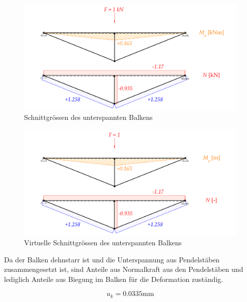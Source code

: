 \documentclass[
  letterpaper,
  DIV=11]{scrreprt}
\begin{document}
\begin{figure}[H]

{\centering \includegraphics{index_files/mediabag/bilder/aufgabe_ems_fourier_schnittgroessen.pdf}

}

\caption{\label{fig-ems-fourier_schnittgroessen_real}Schnittgrössen des
unterspannten Balkens}

\end{figure}

\begin{figure}[H]

{\centering \includegraphics{index_files/mediabag/bilder/aufgabe_ems_fourier_schnittgroessen_fikt.pdf}

}

\caption{\label{fig-ems-fourier_schnittgroessen_virt}Virtuelle
Schnittgrössen des unterspannten Balkens}

\end{figure}

Da der Balken dehnstarr ist und die Unterspannung aus Pendelstäben
zusammengesetzt ist, sind Anteile aus Normalkraft aus den Pendelstäben
und lediglich Anteile aus Biegung im Balken für die Deformation
zuständig.

\begin{equation}u_{k} = 0.0335 \text{mm}\end{equation}
\end{document}
